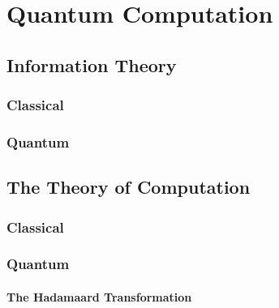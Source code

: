 
\chapter{Quantum Computation}
\label{chap:quantumComputation}
%

\section{Information Theory}

\subsection{Classical}

\subsection{Quantum}

\section{The Theory of Computation}

\subsection{Classical}

\subsection{Quantum}

\subsubsection{The Hadamaard Transformation}

